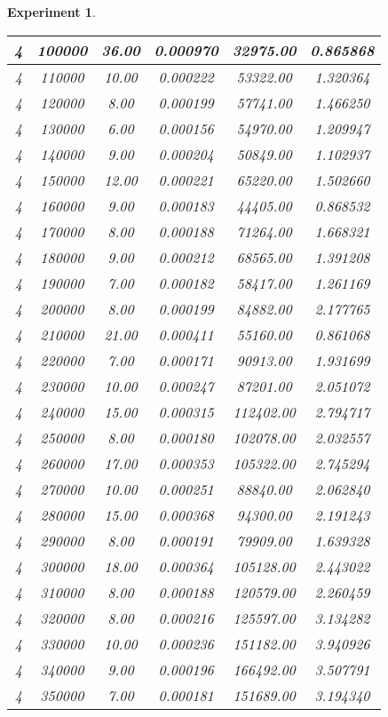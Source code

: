\documentclass[runningheads,a4paper]{llncs}
\newtheorem{experiment}{Experiment}
\begin{document}
\begin{experiment}
\begin{table}[htpb]
{\begin{tabular}{|c|c|c|c|c|c|}
4 & 100000 & 36.00 & 0.000970 & 32975.00  & 0.865868 \\ \hline
4 & 110000 & 10.00 & 0.000222 & 53322.00  & 1.320364 \\ \hline
4 & 120000 & 8.00  & 0.000199 & 57741.00  & 1.466250 \\ \hline
4 & 130000 & 6.00  & 0.000156 & 54970.00  & 1.209947 \\ \hline
4 & 140000 & 9.00  & 0.000204 & 50849.00  & 1.102937 \\ \hline
4 & 150000 & 12.00 & 0.000221 & 65220.00  & 1.502660 \\ \hline
4 & 160000 & 9.00  & 0.000183 & 44405.00  & 0.868532 \\ \hline
4 & 170000 & 8.00  & 0.000188 & 71264.00  & 1.668321 \\ \hline
4 & 180000 & 9.00  & 0.000212 & 68565.00  & 1.391208 \\ \hline
4 & 190000 & 7.00  & 0.000182 & 58417.00  & 1.261169 \\ \hline
4 & 200000 & 8.00  & 0.000199 & 84882.00  & 2.177765 \\ \hline
4 & 210000 & 21.00 & 0.000411 & 55160.00  & 0.861068 \\ \hline
4 & 220000 & 7.00  & 0.000171 & 90913.00  & 1.931699 \\ \hline
4 & 230000 & 10.00 & 0.000247 & 87201.00  & 2.051072 \\ \hline
4 & 240000 & 15.00 & 0.000315 & 112402.00 & 2.794717 \\ \hline
4 & 250000 & 8.00  & 0.000180 & 102078.00 & 2.032557 \\ \hline
4 & 260000 & 17.00 & 0.000353 & 105322.00 & 2.745294 \\ \hline
4 & 270000 & 10.00 & 0.000251 & 88840.00  & 2.062840 \\ \hline
4 & 280000 & 15.00 & 0.000368 & 94300.00  & 2.191243 \\ \hline
4 & 290000 & 8.00  & 0.000191 & 79909.00  & 1.639328 \\ \hline
4 & 300000 & 18.00 & 0.000364 & 105128.00 & 2.443022 \\ \hline
4 & 310000 & 8.00  & 0.000188 & 120579.00 & 2.260459 \\ \hline
4 & 320000 & 8.00  & 0.000216 & 125597.00 & 3.134282 \\ \hline
4 & 330000 & 10.00 & 0.000236 & 151182.00 & 3.940926 \\ \hline
4 & 340000 & 9.00  & 0.000196 & 166492.00 & 3.507791 \\ \hline
4 & 350000 & 7.00  & 0.000181 & 151689.00 & 3.194340 \\ \hline

\end{tabular}}
\end{table}
\end{experiment}
\end{document}
